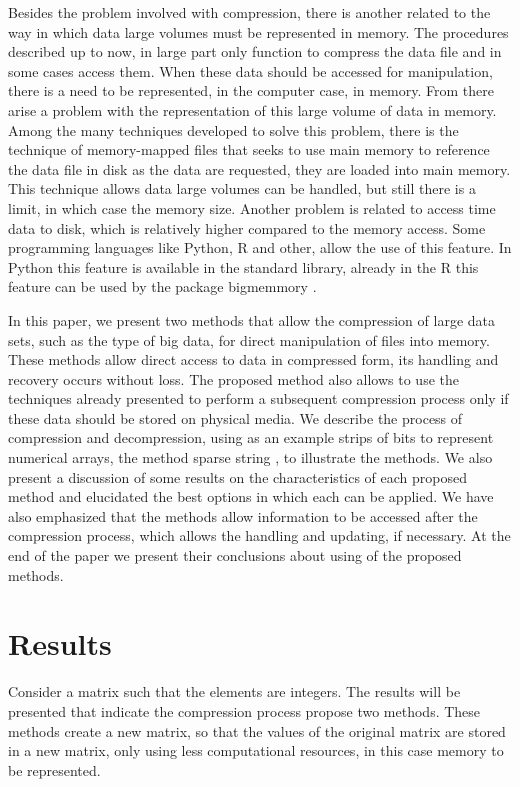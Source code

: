 \documentclass[10pt]{article}
\begin{document}
Besides the problem involved with compression, there is another related to the 
way in which data large volumes must be represented in memory. The procedures 
described up to now, in large part only function to compress the data file and 
in some cases access them. When these data should be accessed for manipulation, 
there is a need to be represented, in the computer case, in memory. From there 
arise a problem with the representation of this large volume of data in memory. 
Among the many techniques developed to solve this problem, there is the 
technique of memory-mapped files that seeks to use main memory to reference the 
data file in disk as the data are requested, they are loaded into main memory. 
This technique allows data large volumes can be handled, but still there is a 
limit, in which case the memory size. Another problem is related to access time 
data to disk, which is relatively higher compared to the memory access. Some 
programming languages ​​like Python, R and other, allow the use of this feature. 
In Python this feature is available in the standard library, already in the R 
this feature can be used by the package bigmemmory \cite{big}. 

In this paper, we present two methods that allow the compression of large data 
sets, such as the type of big data, for direct manipulation of files into 
memory. These methods allow direct access to data in compressed form, its 
handling and recovery occurs without loss. The proposed method also allows to 
use the techniques already presented to perform a subsequent compression process 
only if these data should be stored on physical media. We describe the process 
of compression and decompression, using as an example strips of bits to 
represent numerical arrays, the method sparse string \cite{salomon,salomon2}, to 
illustrate the methods. We also present a discussion of some results on the 
characteristics of each proposed method and elucidated the best options in which 
each can be applied. We have also emphasized that the methods allow information 
to be accessed after the compression process, which allows the handling and 
updating, if necessary. At the end of the paper we present their conclusions 
about using of the proposed methods.

\section*{Results}

Consider a matrix such that the elements are integers. The results will be 
presented that indicate the compression process propose two methods. These 
methods create a new matrix, so that the values ​​of the original matrix are 
stored in a new matrix, only using less computational resources, in this case 
memory to be represented. 
\end{document}
